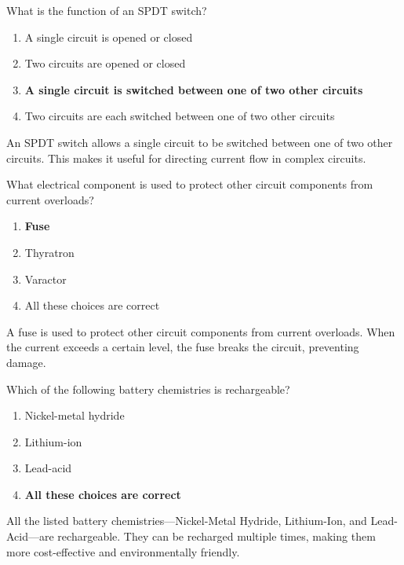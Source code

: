 \begin{tcolorbox}[colback=gray!10!white,colframe=black!75!black,title={T6A08}]
    What is the function of an SPDT switch?
    \begin{enumerate}[label=\Alph*),noitemsep]
        \item A single circuit is opened or closed
        \item Two circuits are opened or closed
        \item \textbf{A single circuit is switched between one of two other circuits}
        \item Two circuits are each switched between one of two other circuits
    \end{enumerate}
\end{tcolorbox}
An SPDT switch allows a single circuit to be switched between one of two other circuits. This makes it useful for directing current flow in complex circuits.

\begin{tcolorbox}[colback=gray!10!white,colframe=black!75!black,title={T6A09}]
    What electrical component is used to protect other circuit components from current overloads?
    \begin{enumerate}[label=\Alph*),noitemsep]
        \item \textbf{Fuse}
        \item Thyratron
        \item Varactor
        \item All these choices are correct
    \end{enumerate}
\end{tcolorbox}
A fuse is used to protect other circuit components from current overloads. When the current exceeds a certain level, the fuse breaks the circuit, preventing damage.

\begin{tcolorbox}[colback=gray!10!white,colframe=black!75!black,title={T6A10}]
    Which of the following battery chemistries is rechargeable?
    \begin{enumerate}[label=\Alph*),noitemsep]
        \item Nickel-metal hydride
        \item Lithium-ion
        \item Lead-acid
        \item \textbf{All these choices are correct}
    \end{enumerate}
\end{tcolorbox}
All the listed battery chemistries—Nickel-Metal Hydride, Lithium-Ion, and Lead-Acid—are rechargeable. They can be recharged multiple times, making them more cost-effective and environmentally friendly.


